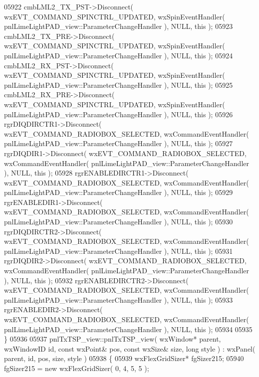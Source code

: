 \begin{DoxyCode}
05922     cmbLML2_TX_PST->Disconnect( wxEVT\_COMMAND\_SPINCTRL\_UPDATED, wxSpinEventHandler( 
      pnlLimeLightPAD_view::ParameterChangeHandler ), NULL, \textcolor{keyword}{this} );
05923     cmbLML2_TX_PRE->Disconnect( wxEVT\_COMMAND\_SPINCTRL\_UPDATED, wxSpinEventHandler( 
      pnlLimeLightPAD_view::ParameterChangeHandler ), NULL, \textcolor{keyword}{this} );
05924     cmbLML2_RX_PST->Disconnect( wxEVT\_COMMAND\_SPINCTRL\_UPDATED, wxSpinEventHandler( 
      pnlLimeLightPAD_view::ParameterChangeHandler ), NULL, \textcolor{keyword}{this} );
05925     cmbLML2_RX_PRE->Disconnect( wxEVT\_COMMAND\_SPINCTRL\_UPDATED, wxSpinEventHandler( 
      pnlLimeLightPAD_view::ParameterChangeHandler ), NULL, \textcolor{keyword}{this} );
05926     rgrDIQDIRCTR1->Disconnect( wxEVT\_COMMAND\_RADIOBOX\_SELECTED, wxCommandEventHandler( 
      pnlLimeLightPAD_view::ParameterChangeHandler ), NULL, \textcolor{keyword}{this} );
05927     rgrDIQDIR1->Disconnect( wxEVT\_COMMAND\_RADIOBOX\_SELECTED, wxCommandEventHandler( 
      pnlLimeLightPAD_view::ParameterChangeHandler ), NULL, \textcolor{keyword}{this} );
05928     rgrENABLEDIRCTR1->Disconnect( wxEVT\_COMMAND\_RADIOBOX\_SELECTED, wxCommandEventHandler( 
      pnlLimeLightPAD_view::ParameterChangeHandler ), NULL, \textcolor{keyword}{this} );
05929     rgrENABLEDIR1->Disconnect( wxEVT\_COMMAND\_RADIOBOX\_SELECTED, wxCommandEventHandler( 
      pnlLimeLightPAD_view::ParameterChangeHandler ), NULL, \textcolor{keyword}{this} );
05930     rgrDIQDIRCTR2->Disconnect( wxEVT\_COMMAND\_RADIOBOX\_SELECTED, wxCommandEventHandler( 
      pnlLimeLightPAD_view::ParameterChangeHandler ), NULL, \textcolor{keyword}{this} );
05931     rgrDIQDIR2->Disconnect( wxEVT\_COMMAND\_RADIOBOX\_SELECTED, wxCommandEventHandler( 
      pnlLimeLightPAD_view::ParameterChangeHandler ), NULL, \textcolor{keyword}{this} );
05932     rgrENABLEDIRCTR2->Disconnect( wxEVT\_COMMAND\_RADIOBOX\_SELECTED, wxCommandEventHandler( 
      pnlLimeLightPAD_view::ParameterChangeHandler ), NULL, \textcolor{keyword}{this} );
05933     rgrENABLEDIR2->Disconnect( wxEVT\_COMMAND\_RADIOBOX\_SELECTED, wxCommandEventHandler( 
      pnlLimeLightPAD_view::ParameterChangeHandler ), NULL, \textcolor{keyword}{this} );
05934     
05935 \}
05936 
05937 pnlTxTSP_view::pnlTxTSP_view( wxWindow* parent, wxWindowID \textcolor{keywordtype}{id}, \textcolor{keyword}{const} wxPoint& pos, \textcolor{keyword}{const} wxSize& 
      size, \textcolor{keywordtype}{long} style ) : wxPanel( parent, id, pos, size, style )
05938 \{
05939     wxFlexGridSizer* fgSizer215;
05940     fgSizer215 = \textcolor{keyword}{new} wxFlexGridSizer( 0, 4, 5, 5 );

\end{DoxyCode}
